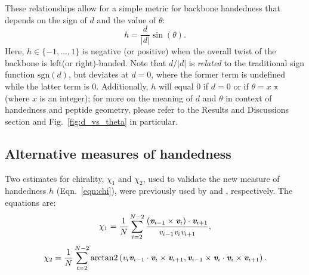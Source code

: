 \documentclass[fleqn,10pt,lineno]{wlpeerj} %
\newcommand{\n}[1]{{\color{blue}#1}}
\newcommand{\Fig}[1]{Fig.~\ref{#1}}
\newcommand{\Eqn}[1]{Eqn.~\ref{#1}}
\newcommand{\h}{h}
\begin{document}
These relationships allow for a simple metric for backbone handedness that depends on the sign of $d$ and the value of $\theta$:
\n{
\begin{equation}\label{eqn:chi}
\h = \frac{d}{\lvert d \rvert} \sin(\theta).
\end{equation}
Here, $\h \in \{-1,\ldots,1\}$ is negative (or positive) when the overall twist of the backbone is left(or right)-handed. Note that $d/\lvert d \rvert$ is {\em related} to the traditional sign function $\textrm{sgn}(d)$, but deviates at $d=0$, where the former term is undefined while the latter term is 0. Additionally, $\h$ will equal 0 if $d=0$ or if $\theta=x\uppi$ (where $x$ is an integer); for more on the meaning of $d$ and $\theta$ in context of handedness and peptide geometry, please refer to the Results and Discussions section and \Fig{fig:d_vs_theta} in particular.} %

\subsection*{Alternative measures of handedness} 

Two estimates for chirality, $\chi_1$ and $\chi_2$, used to validate the new measure of handedness $\h$ (\Eqn{eqn:chi}), were previously used by \cite{Kwiecinska2005} and \cite{Kabsch1983}, respectively. The equations are: 
\begin{equation} \label{eqn:chi1}
\chi_1 = \frac{1}{N}\sum_{i = 2}^{N-2} \frac{(\textit{\textbf{v}}_{i-1} \times \textit{\textbf{v}}_{i})\cdot \textit{\textbf{v}}_{i+1}}{\textit{v}_{i-1} \textit{v}_{i} \textit{v}_{i+1}},
\end{equation}
\begin{equation}\label{eqn:chi2}
\displaystyle \chi_2 = \frac{1}{N}\sum_{i = 2}^{N-2}
 \textrm{arctan2}\left (\textit{v}_i \textit{\textbf{v}}_{i-1} \cdot \textit{\textbf{v}}_i \times \textit{\textbf{v}}_{i+1},\textit{\textbf{v}}_{i-1}\times \textit{\textbf{v}}_i \cdot \textit{\textbf{v}}_i\times \textit{\textbf{v}}_{i+1} \right ).
\end{equation}
\end{document}
